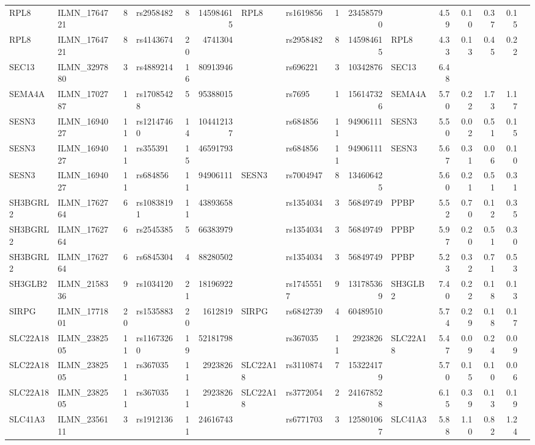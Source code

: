 \documentclass{article}
\begin{document}
\begin{landscape}
{\begin{ThreePartTable}
\begin{longtable}{|llr|lrrl|lrrl|rrrr|r|}
  RPL8 & ILMN\_1764721 & 8 & rs2958482 & 8 & 145984615 & RPL8 & rs1619856 & 1 & 234585790 &  & 4.59 & 0.10 & 0.37 & 0.15 &  \\
  RPL8 & ILMN\_1764721 & 8 & rs4143674 & 20 & 4741304 &  & rs2958482 & 8 & 145984615 & RPL8 & 4.33 & 0.13 & 0.45 & 0.22 &  \\
  SEC13 & ILMN\_3297880 & 3 & rs4889214 & 16 & 80913946 &  & rs696221 & 3 & 10342876 & SEC13 & 6.48 &  &  &  &  \\
  SEMA4A & ILMN\_1702787 & 1 & rs17085428 & 5 & 95388015 &  & rs7695 & 1 & 156147326 & SEMA4A & 5.70 & 0.22 & 1.73 & 1.17 &  \\
  SESN3 & ILMN\_1694027 & 11 & rs12147460 & 14 & 104412137 &  & rs684856 & 11 & 94906111 & SESN3 & 5.50 & 0.02 & 0.51 & 0.15 &  \\
  SESN3 & ILMN\_1694027 & 11 & rs355391 & 15 & 46591793 &  & rs684856 & 11 & 94906111 & SESN3 & 5.67 & 0.31 & 0.06 & 0.10 &  \\
  SESN3 & ILMN\_1694027 & 11 & rs684856 & 11 & 94906111 & SESN3 & rs7004947 & 8 & 134606425 &  & 5.60 & 0.21 & 0.51 & 0.31 &  \\
  SH3BGRL2 & ILMN\_1762764 & 6 & rs10838191 & 11 & 43893658 &  & rs1354034 & 3 & 56849749 & PPBP & 5.52 & 0.70 & 0.12 & 0.35 &  \\
  SH3BGRL2 & ILMN\_1762764 & 6 & rs2545385 & 5 & 66383979 &  & rs1354034 & 3 & 56849749 & PPBP & 5.97 & 0.20 & 0.51 & 0.30 &  \\
  SH3BGRL2 & ILMN\_1762764 & 6 & rs6845304 & 4 & 88280502 &  & rs1354034 & 3 & 56849749 & PPBP & 5.23 & 0.32 & 0.71 & 0.53 &  \\
  SH3GLB2 & ILMN\_2158336 & 9 & rs1034120 & 21 & 18196922 &  & rs17455517 & 9 & 131785369 & SH3GLB2 & 7.40 & 0.22 & 0.18 & 0.13 &  \\
  SIRPG & ILMN\_1771801 & 20 & rs1535883 & 20 & 1612819 & SIRPG & rs6842739 & 4 & 60489510 &  & 5.74 & 0.29 & 0.18 & 0.17 &  \\
  SLC22A18 & ILMN\_2382505 & 11 & rs11673260 & 19 & 52181798 &  & rs367035 & 11 & 2923826 & SLC22A18 & 5.47 & 0.09 & 0.24 & 0.09 &  \\
  SLC22A18 & ILMN\_2382505 & 11 & rs367035 & 11 & 2923826 & SLC22A18 & rs3110874 & 7 & 153224179 &  & 5.70 & 0.15 & 0.10 & 0.06 &  \\
  SLC22A18 & ILMN\_2382505 & 11 & rs367035 & 11 & 2923826 & SLC22A18 & rs3772054 & 2 & 241678528 &  & 6.15 & 0.39 & 0.13 & 0.19 &  \\
  SLC41A3 & ILMN\_2356111 & 3 & rs1912136 & 11 & 24616743 &  & rs6771703 & 3 & 125801067 & SLC41A3 & 5.88 & 1.10 & 0.82 & 1.24 &  \\

\end{longtable}
\end{ThreePartTable}}
\end{landscape}
\end{document}
